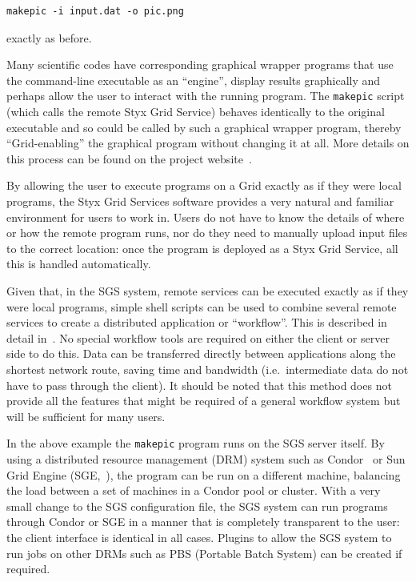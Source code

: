 \documentclass[times,10pt,twocolumn,8.5x11]{article}
\begin{document}
\begin{verbatim}
makepic -i input.dat -o pic.png
\end{verbatim}

\noindent exactly as before.

Many scientific codes have corresponding graphical wrapper programs that use the command-line executable as an ``engine'', display results graphically and perhaps allow the user to interact with the running program.  The {\tt makepic} script (which calls the remote Styx Grid Service) behaves identically to the original executable and so could be called by such a graphical wrapper program, thereby ``Grid-enabling'' the graphical program without changing it at all.  More details on this process can be found on the project website~\cite{sgswebsite}.

By allowing the user to execute programs on a Grid exactly as if they were local programs, the Styx Grid Services software provides a very natural and familiar environment for users to work in.  Users do not have to know the details of where or how the remote program runs, nor do they need to manually upload input files to the correct location: once the program is deployed as a Styx Grid Service, all this is handled automatically.

Given that, in the SGS system, remote services can be executed exactly as if they were local programs, simple shell scripts can be used to combine several remote services to create a distributed application or ``workflow''.  This is described in detail in~\cite{blower:2006}.  No special workflow tools are required on either the client or server side to do this.  Data can be transferred directly between applications along the shortest network route, saving time and bandwidth (i.e.\ intermediate data do not have to pass through the client).  It should be noted that this method does not provide all the features that might be required of a general workflow system but will be sufficient for many users.

\label{sec:condor_sge}
In the above example the {\tt makepic} program runs on the SGS server itself.  By using a distributed resource management (DRM) system such as Condor~\cite{condor} or Sun Grid Engine (SGE,~\cite{sungridengine}), the program can be run on a different machine, balancing the load between a set of machines in a Condor pool or cluster.  With a very small change to the SGS configuration file, the SGS system can run programs through Condor or SGE in a manner that is completely transparent to the user: the client interface is identical in all cases.  Plugins to allow the SGS system to run jobs on other DRMs such as PBS (Portable Batch System) can be created if required.
\end{document}
